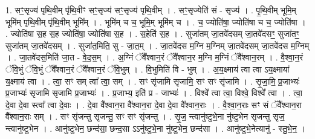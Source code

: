 \documentclass[17pt]{extarticle}
\begin{document}
1. सꣳ॒॒सृज्य॑ पृथि॒वीम् पृ॑थि॒वीꣳ सꣳ॒॒सृज्य॑ सꣳ॒॒सृज्य॑ पृथि॒वीम् । . सꣳ॒॒सृज्येति॑ सं - सृज्य॑ । . पृ॒थि॒वीम् भूमि॒म् भूमि॑म् पृथि॒वीम् पृ॑थि॒वीम् भूमि᳚म् । . भूमि॑म् च च॒ भूमि॒म् भूमि॑म् च । . च॒ ज्योति॑षा॒ ज्योति॑षा च च॒ ज्योति॑षा । . ज्योति॑षा स॒ह स॒ह ज्योति॑षा॒ ज्योति॑षा स॒ह । . स॒हेति॑ स॒ह । . सुजा॑तम् जा॒तवे॑दसम् जा॒तवे॑दसꣳ॒॒ सुजा॑तꣳ॒॒ सुजा॑तम् जा॒तवे॑दसम् । . सुजा॑त॒मिति॒ सु - जा॒त॒म् । . जा॒तवे॑दस म॒ग्नि म॒ग्निम् जा॒तवे॑दसम् जा॒तवे॑दस म॒ग्निम् । . जा॒तवे॑दस॒मिति॑ जा॒त - वे॒द॒स॒म् । . अ॒ग्निं ॅवै᳚श्वान॒रं ॅवै᳚श्वान॒र म॒ग्नि म॒ग्निं ॅवै᳚श्वान॒रम् । . वै॒श्वा॒न॒रं ॅवि॒भुं ॅवि॒भुं ॅवै᳚श्वान॒रं ॅवै᳚श्वान॒रं ॅवि॒भुम् । . वि॒भुमिति॑ वि - भुम् । . अ॒य॒क्ष्माय॑ त्वा त्वा ऽय॒क्ष्माया॑ य॒क्ष्माय॑ त्वा । . त्वा॒ सꣳ सम् त्वा᳚ त्वा॒ सम् । . सꣳ सृ॑जामि सृजामि॒ सꣳ सꣳ सृ॑जामि । . सृ॒जा॒मि॒ प्र॒जाभ्यः॑ प्र॒जाभ्यः॑ सृजामि सृजामि प्र॒जाभ्यः॑ । . प्र॒जाभ्य॒ इति॑ प्र - जाभ्यः॑ । . विश्वे᳚ त्वा त्वा॒ विश्वे॒ विश्वे᳚ त्वा । . त्वा॒ दे॒वा दे॒वा स्त्वा᳚ त्वा दे॒वाः । . दे॒वा वै᳚श्वान॒रा वै᳚श्वान॒रा दे॒वा दे॒वा वै᳚श्वान॒राः । . वै॒श्वा॒न॒राः सꣳ सं ॅवै᳚श्वान॒रा वै᳚श्वान॒राः सम् । . सꣳ सृ॑जन्तु सृजन्तु॒ सꣳ सꣳ सृ॑जन्तु । . सृ॒ज॒ न्त्वानु॑ष्टुभे॒ना नु॑ष्टुभेन सृजन्तु सृज॒ न्त्वानु॑ष्टुभेन । . आनु॑ष्टुभेन॒ छन्द॑सा॒ छन्द॒सा ऽऽनु॑ष्टुभे॒ना नु॑ष्टुभेन॒ छन्द॑सा । . आनु॑ष्टुभे॒नेत्यानु॑ - स्तु॒भे॒न॒ । \newline
\end{document}
